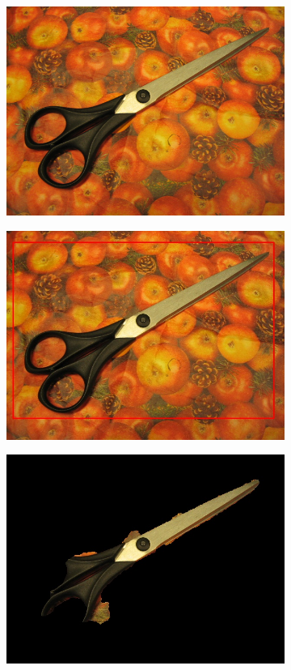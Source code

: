\documentclass[a4paper,11]{article}
\begin{document}
\begin{center}
\begin{figure}[H]
   \begin{subfigure}{0.33\textwidth}
      \centering
      \includegraphics[width=0.9\linewidth]{images/scissors}
    \end{subfigure}
    \begin{subfigure}{.33\textwidth}
      \centering
      \includegraphics[width=0.9\linewidth]{results/input/scissors}
    \end{subfigure}
    \begin{subfigure}{0.33\textwidth}
      \centering
      \includegraphics[width=0.9\linewidth]{results/scissors}
   \end{subfigure}\\
    \vspace{1em}
    

\end{figure}
\end{center}
\end{document}

